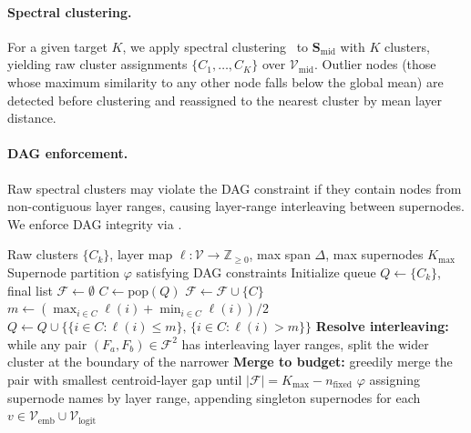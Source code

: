 \documentclass[11pt]{article}
\newcommand{\cV}{\mathcal{V}}
\newcommand{\bS}{\mathbf{S}}
\newcommand{\1}{\mathbbm{1}}
\begin{document}
\paragraph{Spectral clustering.}
For a given target $K$, we apply spectral clustering~\citep{ng2002spectral} to $\bS_{\mathrm{mid}}$ with $K$ clusters, yielding raw cluster assignments $\{C_1, \ldots, C_K\}$ over $\cV_{\mathrm{mid}}$.
Outlier nodes (those whose maximum similarity to any other node falls below the global mean) are detected before clustering and reassigned to the nearest cluster by mean layer distance.

\paragraph{DAG enforcement.}
Raw spectral clusters may violate the DAG constraint if they contain nodes from non-contiguous layer ranges, causing layer-range interleaving between supernodes.
We enforce DAG integrity via .

\begin{algorithm}[t]
\caption{DAG Enforcement}
\label{alg:dag}
\begin{algorithmic}[1]
\Require Raw clusters $\{C_k\}$, layer map $\ell: \cV \to \mathbb{Z}_{\ge 0}$, max span $\Delta$, max supernodes $K_{\max}$
\Ensure Supernode partition $\varphi$ satisfying DAG constraints
\State Initialize queue $Q \leftarrow \{C_k\}$, final list $\mathcal{F} \leftarrow \emptyset$
  \State $C \leftarrow \mathrm{pop}(Q)$
    \State $\mathcal{F} \leftarrow \mathcal{F} \cup \{C\}$
  \Else
    \State $m \leftarrow (\max_{i \in C} \ell(i) + \min_{i \in C} \ell(i)) / 2$
    \State $Q \leftarrow Q \cup \{\{i \in C : \ell(i) \le m\},\, \{i \in C : \ell(i) > m\}\}$
  \EndIf
\EndWhile
\State \textbf{Resolve interleaving:} while any pair $(F_a, F_b) \in \mathcal{F}^2$ has interleaving layer ranges, split the wider cluster at the boundary of the narrower
  \State \textbf{Merge to budget:} greedily merge the pair with smallest centroid-layer gap until $|\mathcal{F}| = K_{\max} - n_{\mathrm{fixed}}$
\EndIf
\State \Return $\varphi$ assigning supernode names by layer range, appending singleton supernodes for each $v \in \cV_{\mathrm{emb}} \cup \cV_{\mathrm{logit}}$
\end{algorithmic}
\end{algorithm}
\end{document}
